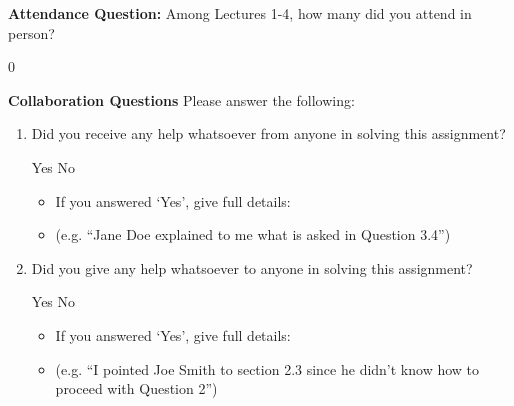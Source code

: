 \documentclass[11pt,addpoints,answers]{exam}
\numberwithin{equation}{section} %
\numberwithin{figure}{section} %
\numberwithin{table}{section} %
\begin{document}
\clearpage
\textbf{Attendance Question:} Among Lectures 1-4, how many did you attend in person?

\begin{tcolorbox}[fit,height=1cm,blank, borderline={1pt}{-2pt},nobeforeafter]
    0
\end{tcolorbox}

    
\textbf{Collaboration Questions} Please answer the following:

\begin{enumerate}
    \item Did you receive any help whatsoever from anyone in solving this assignment?
    \begin{checkboxes}
     \choice Yes
     \CorrectChoice No
    \end{checkboxes}
    \begin{itemize}
        \item If you answered `Yes', give full details:
        \item (e.g. “Jane Doe explained to me what is asked in Question 3.4”)
    \end{itemize}

    \begin{tcolorbox}[fit,height=3cm,blank, borderline={1pt}{-2pt},nobeforeafter]
    \end{tcolorbox}

    \item Did you give any help whatsoever to anyone in solving this assignment?
    \begin{checkboxes}
     \choice Yes
     \CorrectChoice No
    \end{checkboxes}
    \begin{itemize}
        \item If you answered `Yes', give full details:
        \item (e.g. “I pointed Joe Smith to section 2.3 since he didn’t know how to proceed with Question 2”)
    \end{itemize}

    \begin{tcolorbox}[fit,height=3cm,blank, borderline={1pt}{-2pt},nobeforeafter]
    \end{tcolorbox}


\end{enumerate}
\end{document}
